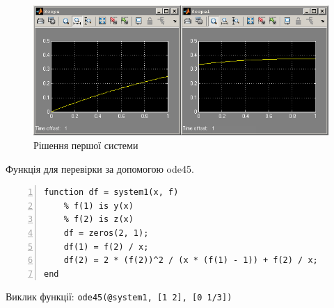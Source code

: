 \documentclass[a4paper, 10pt]{article}
\begin{document}
\begin{enumerate}
{\begin{enumerate}
{		\begin{figure}[H]
		\begin{center}
		\includegraphics{lab2_1_sol.png}
		\caption{Рішення першої системи}
		\end{center}
		\end{figure}

		\noindent
		Функція для перевірки за допомогою ode45.
		\begin{lstlisting}[numbers=left]
function df = system1(x, f)
    % f(1) is y(x)
    % f(2) is z(x)
    df = zeros(2, 1);
    df(1) = f(2) / x;
    df(2) = 2 * (f(2))^2 / (x * (f(1) - 1)) + f(2) / x;
end
		\end{lstlisting}

		Виклик функції: \texttt{ode45(@system1, [1 2], [0 1/3])}

}
\end{enumerate}}
\end{enumerate}
\end{document}
